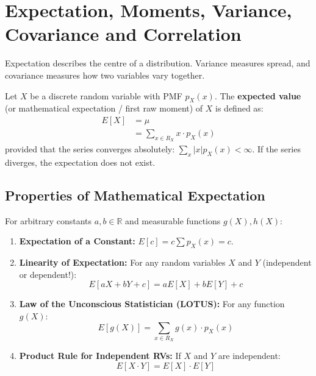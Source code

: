 \documentclass[12pt,a4paper]{article}
\begin{document}
\section{Expectation, Moments, Variance, Covariance and Correlation}

Expectation describes the centre of a distribution. Variance measures spread, and covariance measures how two variables vary together.

\begin{tcolorbox}[defbox, title={\textbf{Definition: Mathematical Expectation of a Discrete RV}}]
Let $X$ be a discrete random variable with PMF $p_X(x)$. The \textbf{expected value} (or mathematical expectation / first raw moment) of $X$ is defined as:
\begin{equation}
  \begin{aligned}
    E[X] &= \mu \\[3pt]
    &= \sum_{x \in R_X} x \cdot p_X(x)
  \end{aligned}
\end{equation}
provided that the series converges absolutely: $\sum_{x} |x| p_X(x) < \infty$. If the series diverges, the expectation does not exist.
\end{tcolorbox}

\subsection{Properties of Mathematical Expectation}
For arbitrary constants $a, b \in \mathbb{R}$ and measurable functions $g(X), h(X)$:
\begin{enumerate}[leftmargin=*, itemsep=3pt]
  \item \textbf{Expectation of a Constant:} $E[c] = c \sum p_X(x) = c$.
  \item \textbf{Linearity of Expectation:} For any random variables $X$ and $Y$ (independent or dependent!):
  \begin{equation}
    E[aX + bY + c] = aE[X] + bE[Y] + c
  \end{equation}
  \item \textbf{Law of the Unconscious Statistician (LOTUS):} For any function $g(X)$:
  \begin{equation}
    E[g(X)] = \sum_{x \in R_X} g(x) \cdot p_X(x)
  \end{equation}
  \item \textbf{Product Rule for Independent RVs:} If $X$ and $Y$ are independent:
  \begin{equation}
    E[X \cdot Y] = E[X] \cdot E[Y]
  \end{equation}
\end{enumerate}
\end{document}
